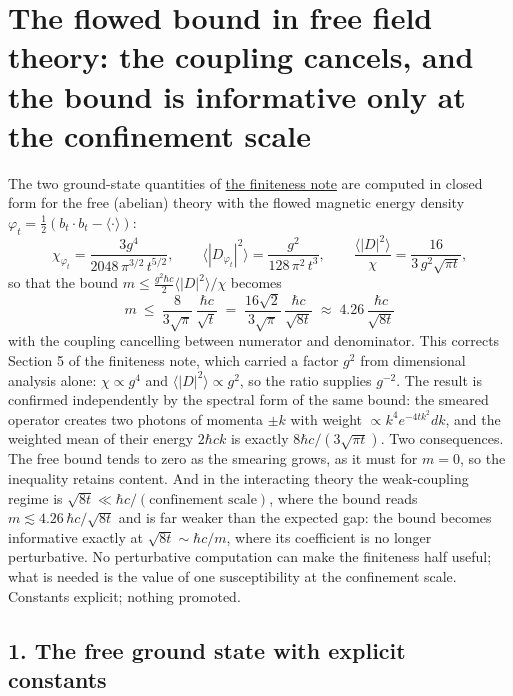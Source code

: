 \documentclass[11pt,a4paper]{article}
\begin{document}
\hypertarget{the-flowed-bound-in-free-field-theory-the-coupling-cancels-and-the-bound-is-informative-only-at-the-confinement-scale}{%
\section{The flowed bound in free field theory: the coupling cancels,
and the bound is informative only at the confinement
scale}\label{the-flowed-bound-in-free-field-theory-the-coupling-cancels-and-the-bound-is-informative-only-at-the-confinement-scale}}

The two ground-state quantities of
\href{finiteness-half-flowed-susceptibility.md}{the finiteness note} are
computed in closed form for the free (abelian) theory with the flowed
magnetic energy density
\(\varphi_t=\tfrac12(b_t\!\cdot\!b_t-\langle\cdot\rangle)\):
\[\chi_{\varphi_t}=\frac{3g^4}{2048\,\pi^{3/2}\,t^{5/2}},\qquad
\big\langle|D_{\varphi_t}|^2\big\rangle=\frac{g^2}{128\,\pi^2\,t^3},\qquad
\frac{\langle|D|^2\rangle}{\chi}=\frac{16}{3\,g^2\sqrt{\pi t}},\] so
that the bound \(m\le\frac{g^2\hbar c}{2}\langle|D|^2\rangle/\chi\)
becomes
\[\boxed{\;m\ \le\ \frac{8}{3\sqrt\pi}\,\frac{\hbar c}{\sqrt t}\;=\;\frac{16\sqrt2}{3\sqrt\pi}\,\frac{\hbar c}{\sqrt{8t}}\;\approx\;4.26\,\frac{\hbar c}{\sqrt{8t}}\;}\]
with the coupling cancelling between numerator and denominator. This
corrects Section 5 of the finiteness note, which carried a factor
\(g^2\) from dimensional analysis alone: \(\chi\propto g^4\) and
\(\langle|D|^2\rangle\propto g^2\), so the ratio supplies \(g^{-2}\).
The result is confirmed independently by the spectral form of the same
bound: the smeared operator creates two photons of momenta \(\pm k\)
with weight \(\propto k^4e^{-4tk^2}dk\), and the weighted mean of their
energy \(2\hbar ck\) is exactly \(8\hbar c/(3\sqrt{\pi t})\). Two
consequences. The free bound tends to zero as the smearing grows, as it
must for \(m=0\), so the inequality retains content. And in the
interacting theory the weak-coupling regime is
\(\sqrt{8t}\ll\hbar c/(\text{confinement scale})\), where the bound
reads \(m\lesssim4.26\,\hbar c/\sqrt{8t}\) and is far weaker than the
expected gap: the bound becomes informative exactly at
\(\sqrt{8t}\sim\hbar c/m\), where its coefficient is no longer
perturbative. No perturbative computation can make the finiteness half
useful; what is needed is the value of one susceptibility at the
confinement scale. Constants explicit; nothing promoted.

\hypertarget{the-free-ground-state-with-explicit-constants}{%
\subsection{1. The free ground state with explicit
constants}\label{the-free-ground-state-with-explicit-constants}}
\end{document}
